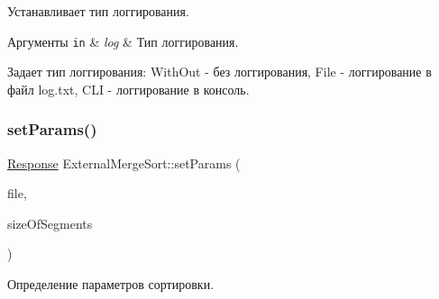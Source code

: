 Устанавливает тип логгирования. 


\begin{DoxyParams}[1]{Аргументы}
\mbox{\tt in}  & {\em log} & Тип логгирования.\\
\hline
\end{DoxyParams}
Задает тип логгирования\+: With\+Out -\/ без логгирования, File -\/ логгирование в файл log.\+txt, C\+LI -\/ логгирование в консоль. \hypertarget{class_external_merge_sort_a45719200cc5e3111fe68c08fe36be715}{}\label{class_external_merge_sort_a45719200cc5e3111fe68c08fe36be715} 
\subsubsection{\texorpdfstring{set\+Params()}{setParams()}}
{\footnotesize\ttfamily \hyperlink{_structures_8h_ab3500e5d3c915d1b5cc58dcab8673fd4}{Response} External\+Merge\+Sort\+::set\+Params (\begin{DoxyParamCaption}\item[{\hyperlink{class_file_manager}{File\+Manager} $\ast$}]{file,  }\item[{long long}]{size\+Of\+Segments }\end{DoxyParamCaption})}



Определение параметров сортировки. 


